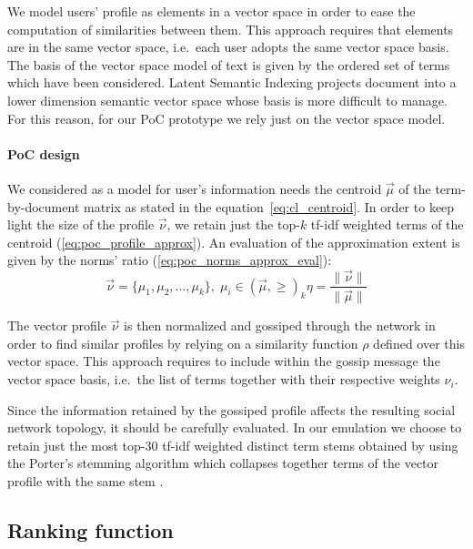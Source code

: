 We model users' profile as elements in a vector space in order to ease the computation of similarities between them. This approach requires that elements are in the same vector space, i.e.\ each user adopts the same vector space basis. The basis of the vector space model of text is given by the ordered set of terms which have been considered. Latent Semantic Indexing projects document into a lower dimension semantic vector space whose basis is more difficult to manage. For this reason, for our PoC prototype we rely just on the vector space model.

\paragraph{PoC design} We considered as a model for user's information needs the centroid $\vec{\mu}$ of the term-by-document matrix as stated in the equation~\ref{eq:cl_centroid}. In order to keep light the size of the profile $\vec{\nu}$, we retain just the top-$k$ tf-idf weighted terms of the centroid (\ref{eq:poc_profile_approx}). An evaluation of the approximation extent is given by the norms' ratio (\ref{eq:poc_norms_approx_eval}):
\begin{subequations}
\begin{equation}
   \vec{\nu} = \{\mu_1, \mu_2, \ldots, \mu_k\}, \; \mu_i \in (\vec{\mu}, \ge)_k
   \label{eq:poc_profile_approx}
\end{equation}
\begin{equation}
   \eta = \frac{\|\vec{\nu}\|}{\|\vec{\mu}\|}
   \label{eq:poc_norms_approx_eval}
\end{equation}
\end{subequations}


The vector profile $\vec{\nu}$ is then normalized and gossiped through the network in order to find similar profiles by relying on a similarity function $\rho$ defined over this vector space. This approach requires to include within the gossip message the vector space basis, i.e.\ the list of terms together with their respective weights $\nu_i$.

Since the information retained by the gossiped profile affects the resulting social network topology, it should be carefully evaluated. In our emulation we choose to retain just the most top-$30$ tf-idf weighted distinct term stems obtained by using the Porter's stemming algorithm which collapses together terms of the vector profile with the same stem \cite{POR97}.

\subsection{Ranking function}

